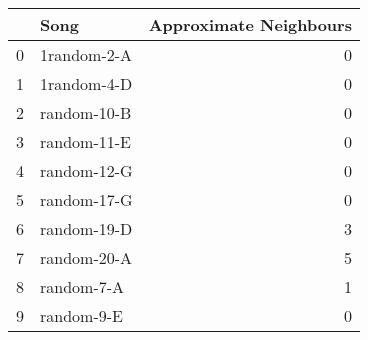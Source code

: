 \begin{tabular}{llr}
\toprule
 & Song & Approximate Neighbours \\
\midrule
0 & 1random-2-A & 0 \\
1 & 1random-4-D & 0 \\
2 & random-10-B & 0 \\
3 & random-11-E & 0 \\
4 & random-12-G & 0 \\
5 & random-17-G & 0 \\
6 & random-19-D & 3 \\
7 & random-20-A & 5 \\
8 & random-7-A & 1 \\
9 & random-9-E & 0 \\
\bottomrule
\end{tabular}
